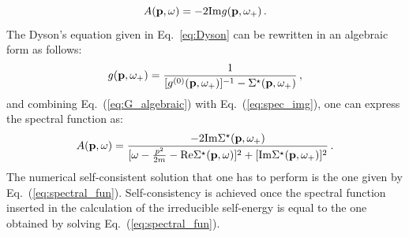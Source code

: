 \begin{equation}
\label{eq:spec_img}
A({\bf p},\omega)=-2{\rm Im}g({\bf p},\omega_+)\,.
\end{equation}
The Dyson's equation given in Eq.~\eqref{eq:Dyson} can be rewritten in an algebraic form as follows:
\begin{equation}
g({\bf p},\omega_+)=\frac{1}{[g^{(0)}({\bf p},\omega_+)]^{-1}-\Sigma^\star({\bf p},\omega_+)}\,,
\label{eq:G_algebraic}
\end{equation}
and combining Eq.~(\ref{eq:G_algebraic}) with Eq.~(\ref{eq:spec_img}),
one can express the spectral function as:
\begin{equation}
A({\bf p},\omega)=\frac{-2\mathrm{Im}\Sigma^\star({\bf p},\omega_+)}
{[\omega-\frac{p^2}{2m}-\mathrm{Re}\Sigma^\star({\bf p},\omega)]^2+[\rm{Im}\Sigma^\star({\bf p},\omega_+)]^2} \,.
\label{eq:spectral_fun}
\end{equation}
The numerical self-consistent solution that one has to perform is the one given by Eq.~(\ref{eq:spectral_fun}). Self-consistency is achieved once the spectral function inserted in the calculation of the irreducible self-energy is equal to the one obtained by solving Eq.~(\ref{eq:spectral_fun}).

